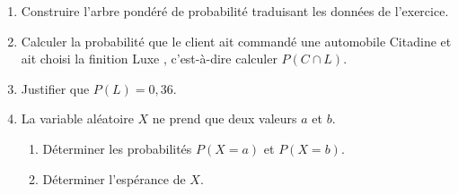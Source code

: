 \documentclass[10pt]{article}
\begin{document}
\begin{enumerate}
\item Construire l'arbre pondéré de probabilité traduisant les données de l'exercice.
\item Calculer la probabilité que le client ait commandé une automobile \og Citadine\fg{} et ait choisi la
finition \og Luxe \fg, c'est-à-dire calculer $P(C \cap L)$.
\item Justifier que $P(L) = 0,36$.
\item La variable aléatoire $X$ ne prend que deux valeurs $a$ et $b$.
	\begin{enumerate}
		\item Déterminer les probabilités $P(X = a)$ et $P(X = b)$. 
		\item Déterminer l'espérance de $X$.
	\end{enumerate}
\end{enumerate}

\bigskip
\end{document}
